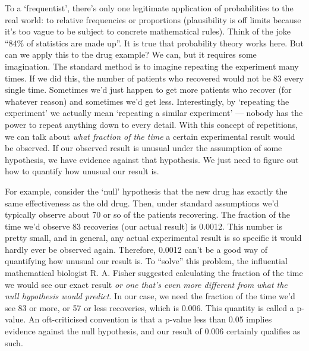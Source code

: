 \documentclass[a4paper, 12pt]{article}
\begin{document}
To a `frequentist', there's only one legitimate application of probabilities to
the real world: to relative frequencies or proportions
(plausibility is off
limits because it's too vague to be subject to concrete mathematical rules).
Think of the joke
``84\% of statistics are made up''. It is true that probability theory works
here. But can we apply this to the drug example? We can, but it requires
some imagination.
The standard method is to imagine repeating the experiment many times.
If we did this, the number of patients who recovered would
not be 83 every single time. Sometimes we'd just happen to get more patients
who recover (for whatever reason) and sometimes we'd get less. Interestingly,
by `repeating the experiment' we actually mean `repeating a similar experiment'
--- nobody has the power to repeat anything down to every detail.
With this concept of repetitions, we can talk about {\em what fraction of the
time} a certain experimental result would be observed. If our observed result
is unusual under the assumption of some hypothesis, we have evidence against
that hypothesis. We just need to figure out how to quantify how unusual our
result is.

For example, consider the `null' hypothesis that the new drug
has exactly the same effectiveness as the old drug. Then, under standard assumptions we'd
typically observe about 70 or so of the patients recovering. The fraction of
the time we'd observe 83 recoveries (our actual result) is 0.0012. This number is pretty small, and in
general, any actual experimental result is so specific it would hardly
ever be observed again. Therefore, 0.0012 can't be a good way of quantifying how unusual
our result is. To ``solve'' this problem, the influential mathematical
biologist R. A. Fisher suggested calculating the fraction of the time we would
see our exact result {\em or one that's even more different from what the null
hypothesis would predict}. In our case, we need the fraction of the time we'd
see 83 or more, or 57 or less recoveries, which is 0.006.
This quantity is called a p-value.
An oft-criticised convention is that a p-value less than 0.05 implies evidence
against the null hypothesis, and our result of 0.006 certainly qualifies
as such.
\end{document}
